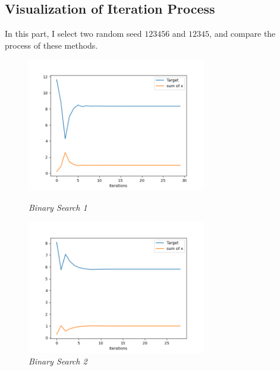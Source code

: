 \documentclass[12pt, a4paper, oneside]{article}
\begin{document}
\subsection{Visualization of Iteration Process}
In this part, I select two random seed $123456$ and $12345$, and compare the process of these methods.
\begin{figure}[H]
    \begin{minipage}[H]{0.5\linewidth} %
            \centering
            \includegraphics[width=7.8cm]{T of B1.png}
            \caption{\textit{Binary Search 1}}
     \end{minipage}
     \begin{minipage}[H]{0.5\linewidth}
        \hspace{0.2mm}
         \includegraphics[width=7.8cm]{T of B2.png}
         \caption{\textit{Binary Search 2}}
      \end{minipage}
\end{figure}
\end{document}
